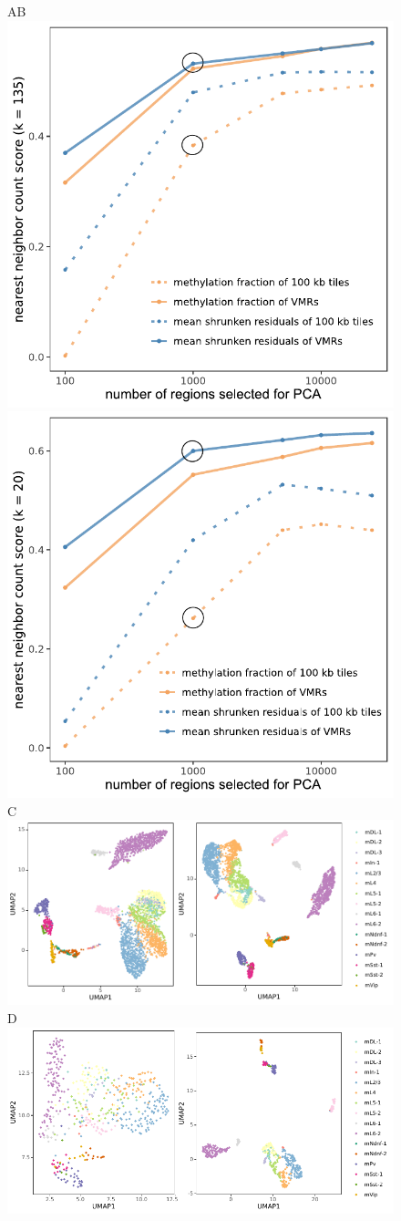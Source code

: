 \documentclass[twocolumn,10pt]{article}
\begin{document}
\begin{figure}
    \begin{center}
        A\hspace{.4\textwidth}B\hspace*{.3\textwidth}~\\
        \hspace{.3cm}\includegraphics[width=.35\textwidth]{part_leonie_git/leonie_plots/complete_135k_12cm_log.pdf}
        \hspace{1cm}\includegraphics[width=.35\textwidth]{part_leonie_git/leonie_plots/cell500_20k_12cm_log.pdf}\\
        C\hspace*{.7\textwidth}~\\
        \hspace{.3cm}\includegraphics[width=.75\textwidth]{part_leonie_git/leonie_plots/UMAP_fulldataset.pdf}\\
        D\hspace*{.7\textwidth}~\\
        \hspace{.3cm}\includegraphics[width=.75\textwidth]{part_leonie_git/leonie_plots/UMAP_reduceddataset.pdf}

\end{center}
\end{figure}
\end{document}
